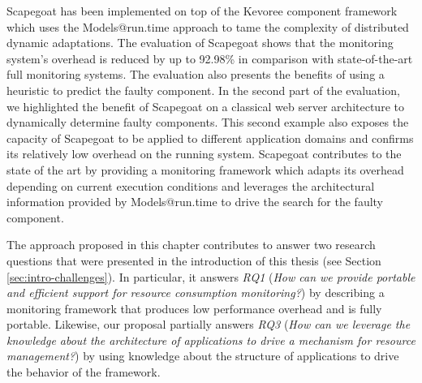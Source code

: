 Scapegoat has been implemented on top of the Kevoree component framework which uses the Models@run.time approach to tame the complexity of distributed dynamic adaptations.
The evaluation of Scapegoat shows that the monitoring system's overhead is reduced by up to 92.98\% in comparison with state-of-the-art full monitoring systems. 
The evaluation also presents the benefits of using a heuristic to predict the faulty component.
In the second part of the evaluation, we highlighted the benefit of Scapegoat on a classical web server architecture to dynamically determine faulty components.
This second example also exposes the capacity of Scapegoat to be applied to different application domains and confirms its relatively low overhead on the running system.
Scapegoat contributes to the state of the art by providing a monitoring framework which adapts its overhead depending on current execution conditions and leverages the architectural information provided by Models@run.time to drive the search for the faulty component.

The approach proposed in this chapter contributes to answer two research questions that were presented in the introduction of this thesis (see Section \ref{sec:intro-challenges}).
In particular, it answers \textit{RQ1} (\textit{How can we provide portable and efficient support for resource consumption monitoring?}) by describing a monitoring framework that produces low performance overhead and is fully portable.
Likewise, our proposal partially answers \textit{RQ3} (\textit{How can we leverage the knowledge about the architecture of applications to drive
a mechanism for resource management?}) by using knowledge about the structure of applications to drive the behavior of the framework.

